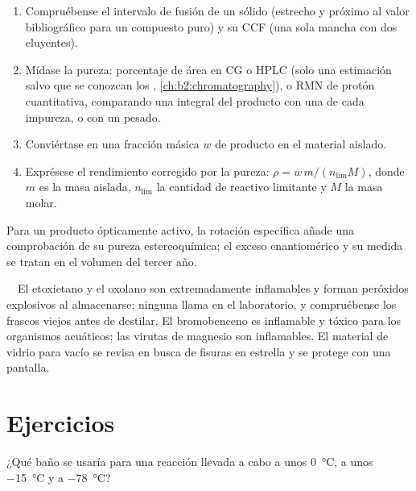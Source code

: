 \begin{method}\label{met:b2:lab-techniques-2:purity}
\begin{enumerate}
  \item Compruébense el intervalo de fusión de un sólido (estrecho y próximo al valor bibliográfico para un compuesto
        puro) y su CCF (una sola mancha con dos eluyentes).
  \item Mídase la pureza: porcentaje de área en CG o HPLC (solo una estimación salvo que se conozcan los ,
        \cref{ch:b2:chromatography}), o RMN de protón cuantitativa, comparando una integral del producto
        con una de cada impureza, o con un  pesado.
  \item Conviértase en una fracción másica $w$ de producto en el material aislado.
  \item Exprésese el rendimiento corregido por la pureza: $\rho = w\,m/(n_{\mathrm{lim}}M)$, donde $m$ es la
        masa aislada, $n_{\mathrm{lim}}$ la cantidad de reactivo limitante y $M$ la masa molar.
\end{enumerate}
\end{method}

Para un producto ópticamente activo, la rotación específica añade una comprobación de su pureza estereoquímica;
el exceso enantiomérico y su medida se tratan en el volumen del tercer año.

\begin{safety}{\,\,\,\,}
El etoxietano y el oxolano son extremadamente inflamables y forman peróxidos explosivos al almacenarse; ninguna llama en
el laboratorio, y compruébense los frascos viejos antes de destilar. El bromobenceno es inflamable y tóxico para los organismos
acuáticos; las virutas de magnesio son inflamables. El material de vidrio para vacío se revisa en busca de fisuras en estrella y se protege con una pantalla.
\end{safety}

\section{Ejercicios}

\begin{exercise}[$\star$]\label{exo:b2:lab-techniques-2:1}
¿Qué baño se usaría para una reacción llevada a cabo a unos \qty{0}{\degreeCelsius}, a unos
\qty{-15}{\degreeCelsius} y a \qty{-78}{\degreeCelsius}?
\end{exercise}

